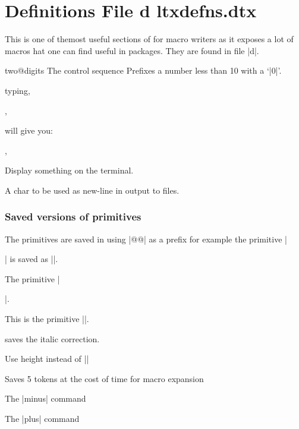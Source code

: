 \chapter{Definitions File d ltxdefns.dtx}
This is one of themost useful sections of \latex for macro writers as it exposes a lot of macros hat one can find useful in packages. They are found in file |d|.

\begin{docCommand} { two@digits} { }
The control sequence\cmd{\two@digits} Prefixes a number less than 10 with a `|0|'.
\end{docCommand}
typing,
\begin{teX}
,
\end{teX}

will give you:

\makeatletter
{},
\makeatother


 Display something on the terminal.

\begin{teX}
 \def\typeout#1{\begingroup\set@display@protect
 \immediate\write\@unused{#1}\endgroup}
\end{teX}

 A char to be used as new-line in output to files.



\subsection{Saved versions of primitives}

The \tex primitives are saved in \latex using |@@| as a prefix for example the \tex primitive |\par| is saved as |\@@par|.

\begin{trivlist}

\item {} The \tex primitive |\par|.

\item {} This is the \tex primitive |\-|.

\item {} saves the italic correction.

\item {} Use height instead of |\height|

\item  {}

\item  {} Saves 5 tokens at the cost of time for macro expansion

\item {} The |minus| command

\item  {} The |plus| command
\end{trivlist}


